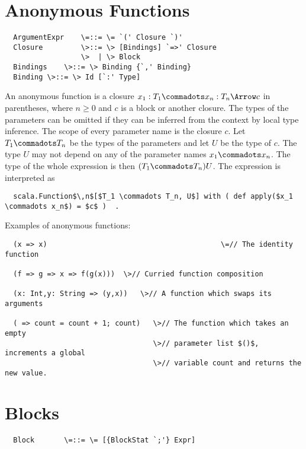 \documentclass[11pt]{report}
\begin{document}
\section{Anonymous Functions}
\label{sec:closures}

\syntax\begin{verbatim}
  ArgumentExpr    \=::= \= `(' Closure `)'
  Closure         \>::= \> [Bindings] `=>' Closure
                  \>  | \> Block
  Bindings	  \>::= \> Binding {`,' Binding}
  Binding \>::= \> Id [`:' Type]
\end{verbatim}

An anonymous function is a closure $x_1: T_1 \commadots x_n: T_n
\Arrow c$ in parentheses, where $n \geq 0$ and $c$ is a block or another closure.
The types of the parameters can be omitted if they can be inferred
from the context by local type inference.  The scope of every
parameter name is the closure $c$. Let $T_1
\commadots T_n$ be the types of the parameters and let $U$ be the type
of $c$. The type $U$ may not depend on any of the parameter
names $x_1 \commadots x_n$. The type of the whole expression is then
$(T_1 \commadots T_n) U$. The expression is interpreted as
\begin{verbatim}
  scala.Function$\,n$[$T_1 \commadots T_n, U$] with ( def apply($x_1 \commadots x_n$) = $c$ )  .
\end{verbatim}

\example Examples of anonymous functions:

\begin{verbatim}
  (x => x)                                         \=// The identity function

  (f => g => x => f(g(x)))	\>// Curried function composition

  (x: Int,y: String => (y,x))   \>// A function which swaps its arguments

  ( => count = count + 1; count)   \>// The function which takes an empty
                                   \>// parameter list $()$, increments a global
                                   \>// variable count and returns the new value.
\end{verbatim}

\section{Blocks}
\label{sec:blocks}

\syntax\begin{verbatim}
  Block       \=::= \= [{BlockStat `;'} Expr]
\end{verbatim}
\end{document}

